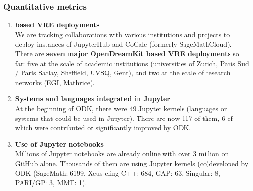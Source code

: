 \subsubsection{Quantitative metrics}
\begin{enumerate}
\item \textbf{\ODK based VRE deployments}\\
  We are
  \href{https://github.com/OpenDreamKit/OpenDreamKit/issues/174}{tracking}
  collaborations with various institutions and projects to deploy
  instances of JupyterHub and CoCalc (formerly SageMathCloud). There
  are \textbf{seven major OpenDreamKit based VRE deployments} so far:
  five at the scale of academic institutions (universities of Zurich,
  Paris Sud / Paris Saclay, Sheffield, UVSQ, Gent), and two at the
  scale of research networks (EGI, Mathrice).

\item \textbf{Systems and languages integrated in Jupyter}\\
  At the beginning of ODK, there were 49 Jupyter kernels (languages or
  systems that could be used in Jupyter). There are now 117 of them, 6
  of which were contributed or significantly improved by ODK.
\item \textbf{Use of Jupyter notebooks}\\
  Millions of Jupyter notebooks are already online with over 3 million
  on GitHub alone. Thousands of them are using Jupyter kernels
  (co)developed by ODK (SageMath: 6199, Xeus-cling C++: 684, GAP: 63,
  Singular: 8, PARI/GP: 3, MMT: 1).


\end{enumerate}
